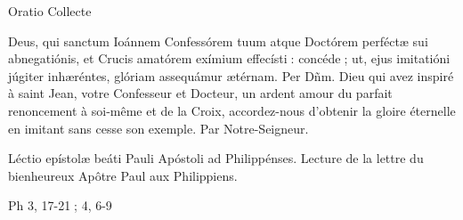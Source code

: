 \begin{paracol}{2}
Oratio
\switchcolumn
Collecte
\switchcolumn*

Deus, qui sanctum Ioánnem  Confessórem tuum atque Doctórem perféctæ sui abnegatiónis, et Crucis amatórem exímium effecísti : concéde ; ut, ejus imitatióni júgiter inhæréntes, glóriam assequámur ætérnam. Per Dñm.
\switchcolumn
Dieu qui avez inspiré à saint Jean, votre Confesseur et Docteur, un ardent amour du parfait renoncement à soi-même et de la Croix, accordez-nous d’obtenir la gloire éternelle en imitant sans cesse son exemple. Par Notre-Seigneur.
\switchcolumn*

Léctio epístolæ beáti Pauli Apóstoli ad Philippénses.
\switchcolumn
Lecture de la lettre du bienheureux Apôtre Paul aux Philippiens.
\switchcolumn*

Ph 3, 17-21 ; 4, 6-9
\switchcolumn

\switchcolumn*


\end{paracol}
